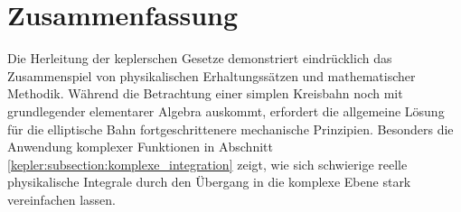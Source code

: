 %
%
%
%
\section{Zusammenfassung
  \label{kepler:section:zusammenfassung}}

Die Herleitung der keplerschen Gesetze demonstriert eindrücklich das Zusammenspiel von physikalischen Erhaltungssätzen und mathematischer Methodik.
Während die Betrachtung einer simplen Kreisbahn noch mit grundlegender elementarer Algebra auskommt, erfordert die allgemeine Lösung für die elliptische Bahn fortgeschrittenere mechanische Prinzipien.
Besonders die Anwendung komplexer Funktionen in Abschnitt \ref{kepler:subsection:komplexe_integration} zeigt, wie sich schwierige reelle physikalische Integrale durch den Übergang in die komplexe Ebene stark vereinfachen lassen.


